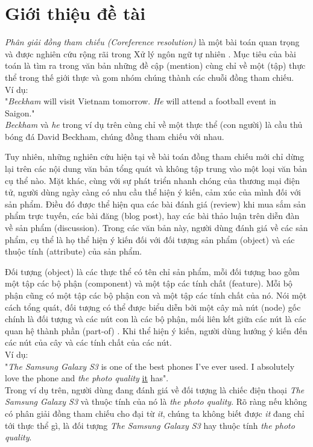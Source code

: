 \documentclass[12pt]{report}
\begin{document}
	\chapter{Giới thiệu đề tài}	
		\par \textit{Phân giải đồng tham chiếu (Coreference resolution)} là một bài toán quan trọng và được nghiên cứu rộng rãi trong Xử lý ngôn ngữ tự nhiên \cite{mainpaper}. Mục tiêu của bài toán là tìm ra trong văn bản những đề cập (mention) cùng chỉ về một (tập) thực thể trong thế giới thực và gom nhóm chúng thành các chuỗi đồng tham chiếu.\\
		Ví dụ: \\
		"\textit{Beckham} will visit Vietnam tomorrow. \textit{He} will attend a football event in Saigon."\\
		\textit{Beckham} và \textit{he} trong ví dụ trên cùng chỉ về một thực thể (con người) là cầu thủ bóng đá David Beckham, chúng đồng tham chiếu với nhau.
		\par Tuy nhiên, những nghiên cứu hiện tại về bài toán đồng tham chiếu mới chỉ dừng lại trên các nội dung văn bản tổng quát và không tập trung vào một loại văn bản cụ thể nào. Mặt khác, cùng với sự phát triển nhanh chóng của thương mại điện tử, người dùng ngày càng có nhu cầu thể hiện ý kiến, cảm xúc của mình đối với sản phẩm. Điều đó được thể hiện qua các bài đánh giá (review) khi mua sắm sản phẩm trực tuyến, các bài đăng (blog post), hay các bài thảo luận trên diễn đàn về sản phẩm (discussion). Trong các văn bản này, người dùng đánh giá về các sản phẩm, cụ thể là họ thể hiện ý kiến đối với đối tượng sản phẩm (object) và các thuộc tính (attribute) của sản phẩm. 
		\par Đối tượng (object) là các thực thể có tên chỉ sản phẩm, mỗi đối tượng bao gồm một tập các bộ phận (component) và một tập các tính chất (feature). Mỗi bộ phận cũng có một tập các bộ phận con và một tập các tính chất của nó. Nói một cách tổng quát, đối tượng có thể được biểu diễn bởi một cây mà nút (node) gốc chính là đối tượng và các nút con là các bộ phận, mối liên kết giữa các nút là các quan hệ thành phần (part-of) \cite{sentiment}. Khi thể hiện ý kiến, người dùng hướng ý kiến đến các nút của cây và các tính chất của các nút.\\
		Ví dụ:\\
		"\textit{The Samsung Galaxy S3} is one of the best phones I've ever used. I absolutely love the phone and \textit{the photo quality} \underline{it} has".\\
		Trong ví dụ trên, người dùng đang đánh giá về đối tượng là chiếc điện thoại \textit{The Samsung Galaxy S3} và thuộc tính của nó là \textit{the photo quality}. Rõ ràng nếu không có phân giải đồng tham chiếu cho đại từ \textit{it}, chúng ta không biết được \textit{it} đang chỉ tới thực thể gì, là đối tượng \textit{The Samsung Galaxy S3} hay thuộc tính \textit{the photo quality}.
\end{document}
